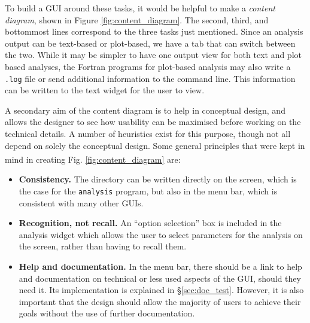 \documentclass[12pt]{article}
\begin{document}
To build a GUI around these tasks, it would be helpful to make a \textit{content diagram}, shown in Figure \ref{fig:content_diagram}. The second, third, and bottommost lines correspond to the three tasks just mentioned. Since an analysis output can be text-based or plot-based, we have a tab that can switch between the two. While it may be simpler to have one output view for both text and plot based analyses, the Fortran programs for plot-based analysis may also write a \texttt{.log} file or send additional information to the command line. This information can be written to the text widget for the user to view.

A secondary aim of the content diagram is to help in conceptual design, and allows the designer to see how usability can be maximised before working on the technical details. A number of heuristics exist for this purpose, though not all depend on solely the conceptual design. Some general principles that were kept in mind in creating Fig. \ref{fig:content_diagram} are:\textsuperscript{\cite{heuristics}}
\begin{itemize}
    \item \textbf{Consistency.} The directory can be written directly on the screen, which is the case for the \texttt{analysis} program, but also in the menu bar, which is consistent with many other GUIs.
    \item \textbf{Recognition, not recall.} An ``option selection'' box is included in the analysis widget which allows the user to select parameters for the analysis on the screen, rather than having to recall them.
    \item \textbf{Help and documentation.} In the menu bar, there should be a link to help and documentation on technical or less used aspects of the GUI, should they need it. Its implementation is explained in \S\ref{sec:doc_test}. However, it is also important that the design should allow the majority of users to achieve their goals without the use of further documentation.
\end{itemize}
\end{document}
